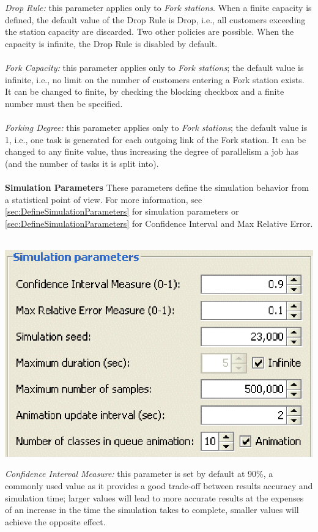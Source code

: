 \emph{Drop Rule:}
this parameter applies only to \emph{Fork stations}. When a finite capacity is defined, the default value of the Drop Rule is Drop, i.e., all customers exceeding the station capacity are discarded. Two other policies are possible. When the capacity is infinite, the Drop Rule is disabled by default.\\\\
\emph{Fork Capacity: }
this parameter applies only to \emph{Fork stations}; the default value is infinite, i.e., no limit on the number of customers entering a Fork station exists. It can be changed to finite, by checking the blocking checkbox and a finite number must then be specified.\\\\
\emph{Forking Degree: }
this parameter applies only to \emph{Fork stations}; the default value is 1, i.e., one task is generated for each outgoing link of the Fork station. It can be changed to any finite value, thus increasing the degree of parallelism a job has (and the number of tasks it is split into).\\\\
\textbf{Simulation Parameters}
These parameters define the simulation behavior from a statistical point of view. For more information, see \autoref{sec:DefineSimulationParameters} for simulation parameters or \autoref{sec:DefineSimulationParameters} for Confidence Interval and Max Relative Error.\\\\
\begin{center}
\includegraphics[scale=.5]{img/jsim/Simulation_parameters.eps}
\end{center}
\emph{Confidence Interval Measure: }
this parameter is set by default at 90\%, a commonly used value as it provides a good trade-off between results accuracy and simulation time; larger values will lead to more accurate results at the expenses of an increase in the time the simulation takes to complete, smaller values will achieve the opposite effect.\\\\
